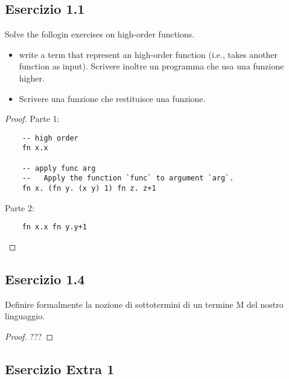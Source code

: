 \documentclass[12pt,a4paper,oneside]{book}
\begin{document}
\subsection{Esercizio 1.1}

\begin{exercise}
    Solve the follogin exercises on high-order functions. 
    \begin{itemize}
        \item write a term that represent an high-order function
          (i.e., takes another function as input). Scrivere inoltre un
          programma che usa una funzione higher.
        \item Scrivere una funzione che restituisce una funzione.
    \end{itemize}

\begin{proof}
    Parte 1:
    \begin{verbatim}
    -- high order
    fn x.x

    -- apply func arg
    --   Apply the function `func` to argument `arg`.
    fn x. (fn y. (x y) 1) fn z. z+1
    \end{verbatim}

    Parte 2:
    \begin{verbatim}
    fn x.x fn y.y+1
    \end{verbatim}

\end{proof}

\end{exercise}

\subsection{Esercizio 1.4}

\begin{exercise}
    Definire formalmente la nozione di sottotermini di un termine M
    del nostro linguaggio.
    \begin{proof}
        ??? 
    \end{proof}
\end{exercise}

\subsection{Esercizio Extra 1}
\end{document}
